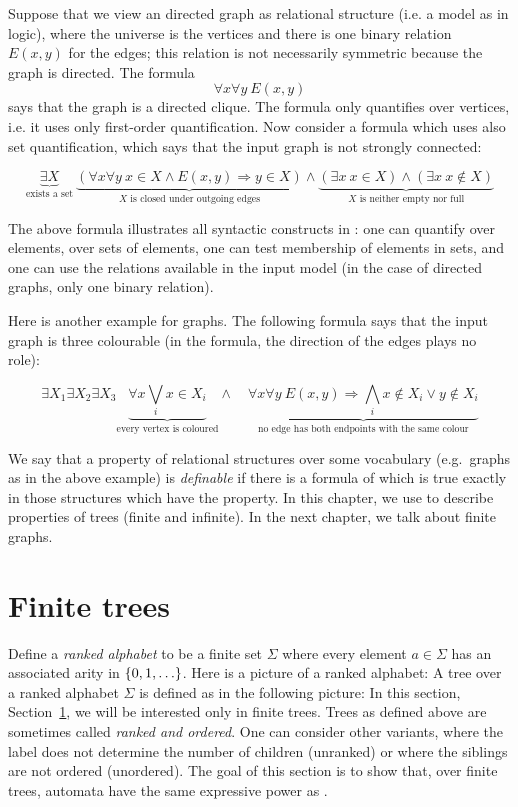 \begin{example}\label{ex:mso-graphs}
Suppose that we view an directed graph as relational structure (i.e. a model as in logic), where the universe is the vertices and there is one binary relation $E(x,y)$ for the edges; this relation is not necessarily symmetric because the graph is directed. The  formula $$ \forall x \forall y \ E(x,y)$$ says that the graph is a directed clique. The formula only quantifies over vertices, i.e. it uses only first-order quantification. Now  consider a formula which uses also set quantification, which  says that the input graph is not strongly connected:

$$ \underbrace{\exists X}_{\text{exists a set}} \ \underbrace{(\forall x \forall y\ x \in X \land E(x,y) \Rightarrow y \in X)}_{\text{$X$ is closed under outgoing edges}} \land \underbrace{(\exists x \ x \in X) \land (\exists x \ x \not \in X)}_{\text{$X$ is neither empty nor full}}$$

The above formula illustrates all syntactic  constructs in \mso: one can quantify over elements, over sets of elements, one can test membership of elements in sets, and one can use the relations available in the input model (in the case of directed graphs, only one binary relation).

Here is another example for graphs. The following \mso formula says that the input graph is three colourable (in the formula, the direction of the edges plays no role):

$$\exists X_1 \exists X_2 \exists X_3 \underbrace{\forall x \bigvee_{i}x \in  X_i}_{\text{every vertex is coloured}} \land \quad \underbrace{\forall x \forall y \ E(x,y) \Rightarrow \bigwedge_{i}x \not \in  X_i \lor y \not \in X_i}_{\text{no edge has both endpoints with the same colour}}$$
	
\end{example}

We say that a property of relational structures over some vocabulary (e.g.~graphs as in the above example) is \emph{\mso definable} if there is a formula of \mso which is true exactly in those structures  which have the property. In this chapter, we use \mso to describe properties of trees (finite and infinite). In the next chapter, we talk about finite graphs.

\section{Finite trees}\label{sec:finite-trees}
 Define a \emph{ranked alphabet} to be a finite set $\Sigma$ where every element $a \in \Sigma$ has an associated arity in $\{0,1,\ldots\}$. Here is a picture of a ranked alphabet:
A  tree over a ranked alphabet $\Sigma$ is defined as in the following picture:
In this section, Section~\ref{sec:finite-trees}, we will be interested only in finite trees.
Trees as defined above are sometimes called \emph{ranked and ordered}. One can consider other variants, where the label does not determine the number of children (unranked) or where the siblings are not ordered (unordered).  The goal of this section is to show that, over finite trees, automata have the same expressive power as \mso.

